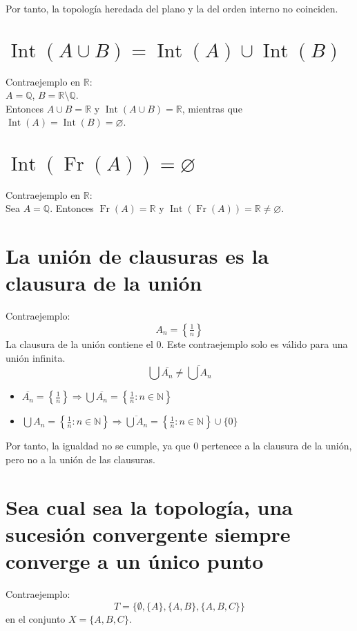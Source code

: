 \documentclass[12pt]{article}
\begin{document}
Por tanto, la topología heredada del plano y la del orden interno no coinciden.
\section*{\(\operatorname{Int}(A\cup B) = \operatorname{Int}(A)\cup \operatorname{Int}(B)\)}
Contraejemplo en \(\mathbb{R}\): \\
\(A=\mathbb{Q}\), \(B=\mathbb{R}\setminus\mathbb{Q}\). \\
Entonces \(A\cup B=\mathbb{R}\) y \(\operatorname{Int}(A\cup B)=\mathbb{R}\),
mientras que \(\operatorname{Int}(A)=\operatorname{Int}(B)=\varnothing\).
\section*{\(\operatorname{Int}(\operatorname{Fr}(A))=\varnothing\)}
Contraejemplo en \(\mathbb{R}\): \\
Sea \(A=\mathbb{Q}\). Entonces \(\operatorname{Fr}(A)=\mathbb{R}\) y \(\operatorname{Int}(\operatorname{Fr}(A))=\mathbb{R} \neq \varnothing\).
\section*{La unión de clausuras es la clausura de la unión}
Contraejemplo:
\[
A_n = \left\{ \tfrac{1}{n} \right\}
\]
La clausura de la unión contiene el \(0\). Este contraejemplo solo es válido para una unión infinita. \\

\[
\bigcup \overline{A_n} \neq \overline{\bigcup A_n}
\]

\begin{itemize}
    \item \(\overline{A_n} = \left\{ \tfrac{1}{n} \right\} \Rightarrow \bigcup \overline{A_n} = \left\{ \tfrac{1}{n} : n \in \mathbb{N} \right\}\)
    \item \(\bigcup A_n = \left\{ \tfrac{1}{n} : n \in \mathbb{N} \right\} \Rightarrow \overline{\bigcup A_n} = \left\{ \tfrac{1}{n} : n \in \mathbb{N} \right\} \cup \{0\}\)
\end{itemize}

Por tanto, la igualdad no se cumple, ya que \(0\) pertenece a la clausura de la unión, pero no a la unión de las clausuras.
\section*{Sea cual sea la topología, una sucesión convergente siempre converge a un único punto}
Contraejemplo: 
\[
T = \{\emptyset, \{A\}, \{A,B\}, \{A,B,C\}\}
\]
en el conjunto \(X = \{A,B,C\}\). \\
\end{document}
